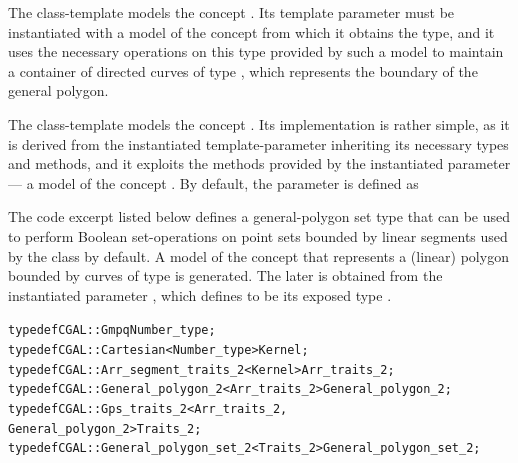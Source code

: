 The class-template 
models the concept . Its template parameter must be
instantiated with a model of the concept
 from which it obtains the 
 type, and it uses the necessary 
operations on this type provided by such a model to maintain a container 
of directed curves of type , which represents the 
boundary of the general polygon.

The class-template 
models the concept . Its implementation is 
rather simple, as it is derived from the instantiated template-parameter 
 inheriting its necessary types and methods, 
and it exploits the methods provided by the instantiated parameter 
 --- a model of the concept .
By default, the  parameter is defined as

The code excerpt listed below defines a general-polygon set type that
can be used to perform Boolean set-operations on point sets bounded by
linear segments used by the  class by default. A
model of the  concept that represents a
(linear) polygon bounded by curves of type  is
generated. The later is obtained from the instantiated parameter
, which defines  to be
its exposed type .
\begin{alltt}
typedef CGAL::Gmpq                              Number_type;
typedef CGAL::Cartesian<Number_type>            Kernel;
typedef CGAL::Arr_segment_traits_2<Kernel>      Arr_traits_2;
typedef CGAL::General_polygon_2<Arr_traits_2>   General_polygon_2;
typedef CGAL::Gps_traits_2<Arr_traits_2,
                           General_polygon_2>   Traits_2;
typedef CGAL::General_polygon_set_2<Traits_2>   General_polygon_set_2;
\end{alltt}

